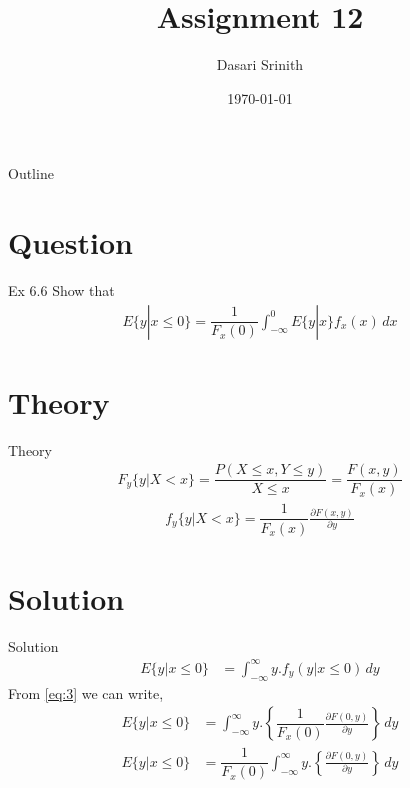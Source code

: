 \documentclass{beamer}
\title{Assignment 12}
\author{Dasari Srinith}
\date{\today}
\providecommand{\cbrak}[1]{\ensuremath{\left\{#1\right\}}}
\begin{document}
    \begin{frame}
        \titlepage 
    \end{frame}

    \begin{frame}{Outline}
        \tableofcontents
    \end{frame}

    \section{Question}
    	\begin{frame}{Ex 6.6}
    	Show that
    	\begin{align}
    	    E\{y|x \le 0\} = \dfrac{1}{F_x(0)} \int_{-\infty}^{0} E\{y|x\}f_x(x) \,dx
    	\end{align}
    	\end{frame}

    \section{Theory}
        \begin{frame}{Theory}
        \begin{align}
            F_y\{y|X<x\} = \dfrac{P(X \le x,Y \le y)}{X \le x} = \dfrac{F(x,y)}{F_x(x)} 
        \end{align}
        \begin{align}
            f_y\{y|X<x\} = \dfrac{1}{F_x(x)}  \frac{\partial F(x,y)}{\partial y} 
            \label{eq:3}
        \end{align}
        \end{frame}

    
    \section{Solution}
    \begin{frame}{Solution}
    \begin{align}
        E\{y|x \le 0\} &= \int_{-\infty}^{\infty} y. f_y(y|x \le 0) \,dy 
    \end{align}
    From \eqref{eq:3} we can write,
    \begin{align}
        E\{y|x \le 0\} &= \int_{-\infty}^{\infty} y. \cbrak{\dfrac{1}{F_x(0)}  \frac{\partial F(0,y)}{\partial y}} \,dy \\[10pt]
        E\{y|x \le 0\} &= \dfrac{1}{F_x(0)} \int_{-\infty}^{\infty} y. \cbrak{  \frac{\partial F(0,y)}{\partial y}} \,dy
        \label{eq:5}
    \end{align}
    \end{frame}
    
\end{document}
